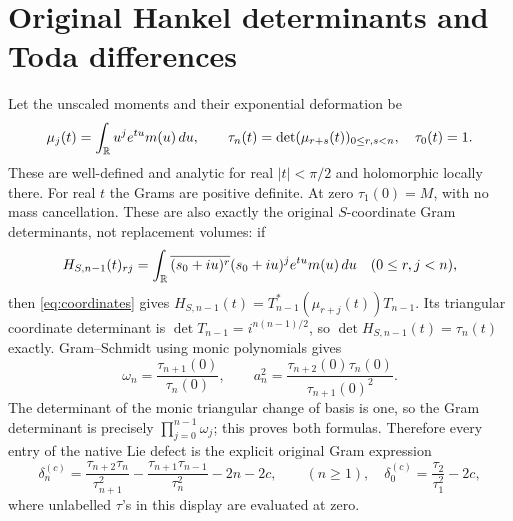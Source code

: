 \documentclass[11pt]{article}
\begin{document}
\section{Original Hankel determinants and Toda differences}

Let the unscaled moments and their exponential deformation be
\begin{equation}\label{eq:tau}
 \mu_j(t)=\int_\mathbb R u^je^{tu}m(u)\,du,\qquad
 \tau_n(t)=\det(\mu_{r+s}(t))_{0\leq r,s<n},\quad \tau_0(t)=1 .
\end{equation}
These are well-defined and analytic for real $|t|<\pi/2$
and holomorphic locally there. For real $t$ the Grams are
positive definite. At zero $\tau_1(0)=M$, with no mass
cancellation. These are also exactly the original
$S$-coordinate Gram determinants, not replacement volumes:
if
\[
 H_{S,n-1}(t)_{rj}
 =\int_\mathbb R\overline{(s_0+iu)^r}(s_0+iu)^j e^{tu}m(u)\,du
 \quad(0\leq r,j<n),
\]
then \eqref{eq:coordinates} gives
$H_{S,n-1}(t)=T_{n-1}^*(\mu_{r+j}(t))T_{n-1}$.
Its triangular coordinate determinant is
$\det T_{n-1}=i^{n(n-1)/2}$, so
$\det H_{S,n-1}(t)=\tau_n(t)$ exactly.
Gram--Schmidt using monic polynomials gives
\begin{equation}\label{eq:hankelratios}
 \omega_n=\frac{\tau_{n+1}(0)}{\tau_n(0)},\qquad
 a_n^2=\frac{\tau_{n+2}(0)\tau_n(0)}{\tau_{n+1}(0)^2}.
\end{equation}
The determinant of the monic triangular change of basis is
one, so the Gram determinant is precisely
$\prod_{j=0}^{n-1}\omega_j$; this proves both formulas.
Therefore every entry of the native Lie defect is the
explicit original Gram expression
\begin{equation}\label{eq:hankeldefect}
 \delta_n^{(c)}
  =\frac{\tau_{n+2}\tau_n}{\tau_{n+1}^2}
    -\frac{\tau_{n+1}\tau_{n-1}}{\tau_n^2}-2n-2c,
 \qquad (n\geq1),
 \quad \delta_0^{(c)}=\frac{\tau_2}{\tau_1^2}-2c,
\end{equation}
where unlabelled $\tau$'s in this display are evaluated at zero.
\end{document}
